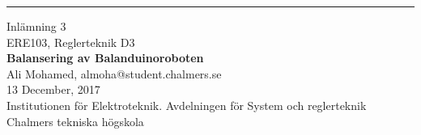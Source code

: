 \newcommand{\no}{3}
\newcommand{\subject}{Balansering av Balanduinoroboten}

\thispagestyle{empty}
\parbox[h!][\textheight][t]{\textwidth}{
\parbox[h!][\textheight][t]{0.19\textwidth}{

\vspace*{0.075\textheight}
\hspace*{0.15\textwidth}
\rule[\textheight]{1.5pt}{0.85\textheight}
}
\parbox[h!][0.85\textheight][t]{0.76\textwidth}{
\vspace{10em}

{\huge Inlämning \no} \\[0.1cm]
{\Large{ERE103, Reglerteknik D3}} \\[0.8cm]
{\Large \bf \subject} \\ [1cm]
{\Large Ali Mohamed, almoha@student.chalmers.se
\\[0.8cm]
13 December, 2017}
 \\[0.44\textheight]
Institutionen för Elektroteknik. Avdelningen för System och reglerteknik\\
Chalmers tekniska högskola
}}
\restoregeometry
